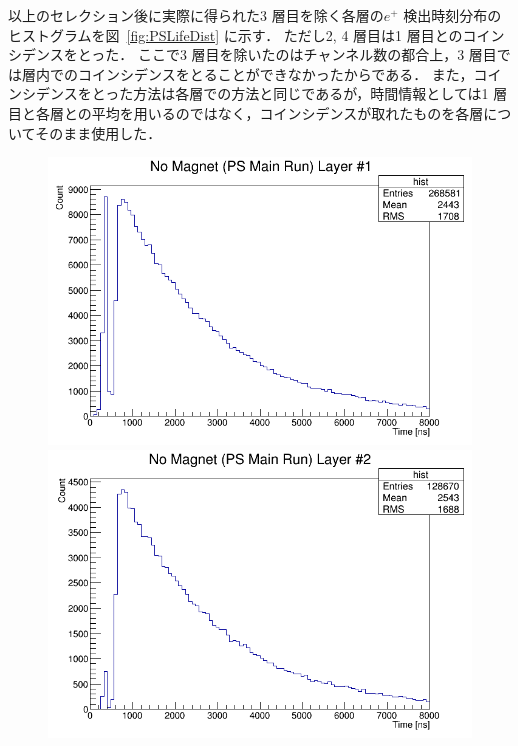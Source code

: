 以上のセレクション後に実際に得られた3 層目を除く各層の$e^{+}$ 検出時刻分布のヒストグラムを図~\ref{fig:PSLifeDist} に示す．
ただし2, 4 層目は1 層目とのコインシデンスをとった．
ここで3 層目を除いたのはチャンネル数の都合上，3 層目では層内でのコインシデンスをとることができなかったからである．
また，コインシデンスをとった方法は各層での方法と同じであるが，時間情報としては1 層目と各層との平均を用いるのではなく，コインシデンスが取れたものを各層についてそのまま使用した．
\begin{figure}[h]
	\centering
	\begin{minipage}{0.45\textwidth}
	\centering
	\includegraphics[width = \textwidth]{figure/odagawa/PSLifetimeDist_Layer0.png}
	\end{minipage}
	\begin{minipage}{0.45\textwidth}
	\centering
	\includegraphics[width = \textwidth]{figure/odagawa/PSLifetimeDist_Layer1.png}

\end{minipage}
\end{figure}
